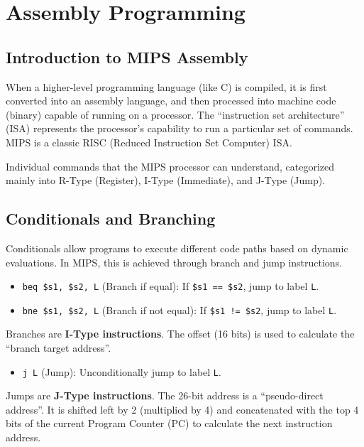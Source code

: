 \chapter{Assembly Programming}

\section{Introduction to MIPS Assembly}

When a higher-level programming language (like C) is compiled, it is first converted into an assembly language, and then processed into machine code (binary) capable of running on a processor. The ``instruction set architecture'' (ISA) represents the processor's capability to run a particular set of commands. MIPS is a classic RISC (Reduced Instruction Set Computer) ISA. 

\begin{vocabulary}
Individual commands that the MIPS processor can understand, categorized mainly into R-Type (Register), I-Type (Immediate), and J-Type (Jump).
\end{vocabulary}

\section{Conditionals and Branching}

Conditionals allow programs to execute different code paths based on dynamic evaluations. In MIPS, this is achieved through branch and jump instructions.

\begin{definition}

\begin{itemize}
    \item \texttt{beq \$s1, \$s2, L} (Branch if equal): If \texttt{\$s1 == \$s2}, jump to label \texttt{L}.
    \item \texttt{bne \$s1, \$s2, L} (Branch if not equal): If \texttt{\$s1 != \$s2}, jump to label \texttt{L}.
\end{itemize}

Branches are \textbf{I-Type instructions}. The offset (16 bits) is used to calculate the ``branch target address''.
\end{definition}

\begin{definition}

\begin{itemize}
    \item \texttt{j L} (Jump): Unconditionally jump to label \texttt{L}.
\end{itemize}

Jumps are \textbf{J-Type instructions}. The 26-bit address is a ``pseudo-direct address''. It is shifted left by 2 (multiplied by 4) and concatenated with the top 4 bits of the current Program Counter (PC) to calculate the next instruction address.
\end{definition}


